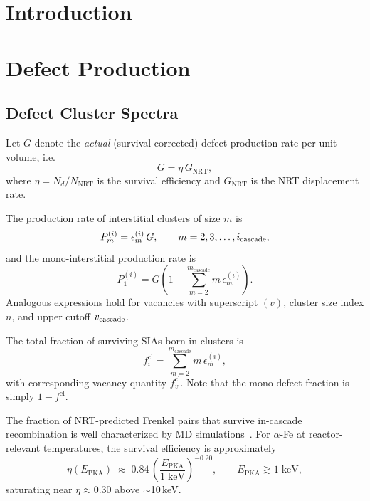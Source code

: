\documentclass[pdflatex,sn-basic]{sn-jnl} %
\newcommand{\cascade}{_{\text{cascade}}}
\begin{document}
\maketitle
\begingroup
\renewcommand\thefootnote{}
\endgroup
\newpage
\tableofcontents
\newpage
\section{Introduction}




\section{Defect Production}
\subsection{Defect Cluster Spectra}
Let $G$ denote the \emph{actual} (survival-corrected) defect production
rate per unit volume, i.e.\
\begin{equation}
  G = \eta\,G_{\mathrm{NRT}},
  \label{eq:G_eta}
\end{equation}
where $\eta = N_d / N_{\mathrm{NRT}}$ is the survival efficiency
and $G_{\mathrm{NRT}}$ is the NRT displacement rate.

The production rate of interstitial clusters of size $m$ is
\begin{equation}
  P_m^{(i)} = \epsilon_m^{(i)}\,G, \qquad m = 2,3,\ldots,i_{\rm cascade},
  \label{eq:Pmi}
\end{equation}
and the mono-interstitial production rate is
\begin{equation}
  P_1^{(i)} = G\!\left(1 - \sum_{m=2}^{m\cascade} m\,\epsilon_m^{(i)}\right).
  \label{eq:P1i}
\end{equation}
Analogous expressions hold for vacancies with superscript $(v)$,
cluster size index $n$, and upper cutoff $v_{\rm cascade}$.

The total fraction of surviving SIAs born in clusters is
\begin{equation}
  f_i^{\mathrm{cl}} = \sum_{m=2}^{m\cascade} m\,\epsilon_m^{(i)},
  \label{eq:ficl}
\end{equation}
with corresponding vacancy quantity $f_v^{\mathrm{cl}}$.
Note that the mono-defect fraction is simply $1 - f^{\mathrm{cl}}$.

The fraction of NRT-predicted Frenkel pairs that survive in-cascade
recombination is well characterized by MD
simulations~\cite{Stoller2000RoleCascadeEnergyTemperature,
Nordlund2018PrimaryDamageReview,Stoller1997PrimaryDamageBCCFe}.
For $\alpha$-Fe at reactor-relevant temperatures, the survival
efficiency is approximately
\begin{equation}
  \eta(E_{\mathrm{PKA}}) \;\approx\; 0.84\,
    \left(\frac{E_{\mathrm{PKA}}}{1\;\mathrm{keV}}\right)^{-0.20},
    \qquad E_{\mathrm{PKA}} \gtrsim 1\;\mathrm{keV},
  \label{eq:eta_fit}
\end{equation}
saturating near $\eta \approx 0.30$ above $\sim$10\,keV.
\end{document}
